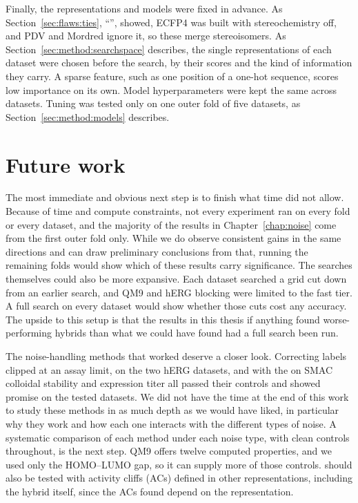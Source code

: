 Finally, the representations and models were fixed in advance. As Section~\ref{sec:flaws:ties}, ``'', showed, ECFP4 was built with stereochemistry off, and PDV and Mordred ignore it, so these merge stereoisomers. As Section~\ref{sec:method:searchspace} describes, the single representations of each dataset were chosen before the search, by their scores and the kind of information they carry. A sparse feature, such as one position of a one-hot sequence, scores low importance on its own. Model hyperparameters were kept the same across datasets. Tuning was tested only on one outer fold of five datasets, as Section~\ref{sec:method:models} describes.

\section{Future work}\label{sec:discussion:future}

The most immediate and obvious next step is to finish what time did not allow. Because of time and compute constraints, not every experiment ran on every fold or every dataset, and the majority of the results in Chapter~\ref{chap:noise} come from the first outer fold only. While we do observe consistent gains in the same directions and can draw preliminary conclusions from that, running the remaining folds would show which of these results carry significance. The searches themselves could also be more expansive. Each dataset searched a grid cut down from an earlier search, and QM9 and hERG blocking were limited to the fast tier. A full search on every dataset would show whether those cuts cost any accuracy. The upside to this setup is that the results in this thesis if anything found worse-performing hybrids than what we could have found had a full search been run. 

The noise-handling methods that worked deserve a closer look. Correcting labels clipped at an assay limit,  on the two hERG datasets, and  with the  on SMAC colloidal stability and expression titer all passed their controls and showed promise on the tested datasets. We did not have the time at the end of this work to study these methods in as much depth as we would have liked, in particular why they work and how each one interacts with the different types of noise. A systematic comparison of each method under each noise type, with clean controls throughout, is the next step. QM9 offers twelve computed properties, and we used only the HOMO--LUMO gap, so it can supply more of those controls.  should also be tested with activity cliffs (ACs) defined in other representations, including the hybrid itself, since the ACs found depend on the representation.

